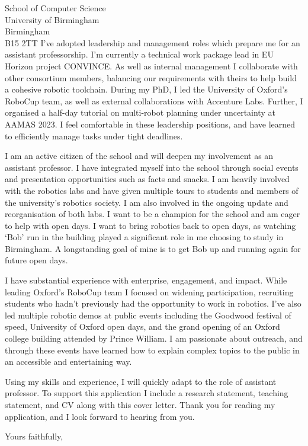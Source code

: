 \documentclass[12pt]{letter}
\begin{document}
\begin{letter}{School of Computer Science \\ University of Birmingham \\ Birmingham \\ B15 2TT}
I've adopted leadership and management roles which prepare me for an assistant professorship.
%
I'm currently a technical work package lead in EU Horizon project CONVINCE.
%
As well as internal management I collaborate with other consortium members, balancing our requirements with theirs to help build a cohesive robotic toolchain.
%
During my PhD, I led the University of Oxford's RoboCup team, as well as external collaborations with Accenture Labs.
%
Further, I organised a half-day tutorial on multi-robot planning under uncertainty at AAMAS 2023.
%
I feel comfortable in these leadership positions, and have learned to efficiently manage tasks under tight deadlines.

I am an active citizen of the school and will deepen my involvement as an assistant professor.
%
I have integrated myself into the school through social events and presentation opportunities such as facts and snacks.
%
I am heavily involved with the robotics labs and have given multiple tours to students and members of the university's robotics society.
%
I am also involved in the ongoing update and reorganisation of both labs.
%
I want to be a champion for the school and am eager to help with open days.
%
I want to bring robotics back to open days, as watching `Bob' run in the building played a significant role in me choosing to study in Birmingham.
%
A longstanding goal of mine is to get Bob up and running again for future open days.


I have substantial experience with enterprise, engagement, and impact.
%
While leading Oxford's RoboCup team I focused on widening participation, recruiting students who hadn't previously had the opportunity to work in robotics.
%
I've also led multiple robotic demos at public events including the Goodwood festival of speed, University of Oxford open days, and the grand opening of an Oxford college building attended by Prince William.
%
I am passionate about outreach, and through these events have learned how to explain complex topics to the public in an accessible and entertaining way.


Using my skills and experience, I will quickly adapt to the role of assistant professor.
%
To support this application I include a research statement, teaching statement, and CV along with this cover letter.
%
Thank you for reading my application, and I look forward to hearing from you.

\closing{\vspace{30pt} Yours faithfully,}
\end{letter}
\end{document}
